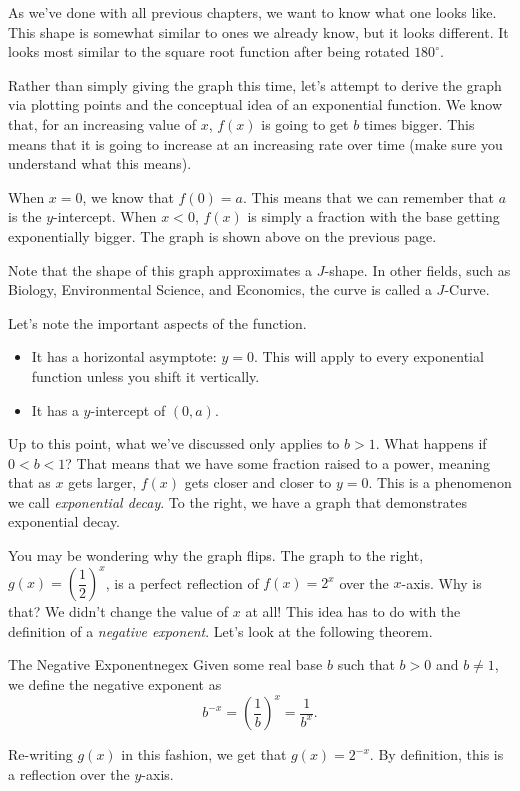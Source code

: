 \documentclass[../book.tex]{subfiles}
\begin{document}
\noindent As we've done with all previous chapters, we want to know what one looks like.  This shape is somewhat similar to ones we already know, but it looks different.  It looks most similar to the square root function after being rotated $180^{\circ}$.  

Rather than simply giving the graph this time, let's attempt to derive the graph via plotting points and the conceptual idea of an exponential function.  We know that, for an increasing value of $x$, $f(x)$ is going to get $b$ times bigger.  This means that it is going to increase at an increasing rate over time (make sure you understand what this means).

When $x=0$, we know that $f(0)=a$.  This means that we can remember that $a$ is the $y$-intercept.  When $x<0$, $f(x)$ is simply a fraction with the base getting exponentially bigger.  The graph is shown above on the previous page.

Note that the shape of this graph approximates a $J$-shape.  In other fields, such as Biology, Environmental Science, and Economics, the curve is called a $J$-Curve.

Let's note the important aspects of the function.  \begin{itemize}
    \item It has a horizontal asymptote: $y = 0$.  This will apply to every exponential function unless you shift it vertically.
    \item It has a $y$-intercept of $(0,a)$.
\end{itemize}

\noindent Up to this point, what we've discussed only applies to $b>1$.  What happens if $0<b<1$?  That means that we have some fraction raised to a power, meaning that as $x$ gets larger, $f(x)$ gets closer and closer to $y=0$.  This is a phenomenon we call \textit{exponential decay}.  To the right, we have a graph that demonstrates exponential decay.  

You may be wondering why the graph flips.  The graph to the right, $g(x)=\left(\dfrac{1}{2}\right)^x$, is a perfect reflection of $f(x)=2^x$ over the $x$-axis.  Why is that?  We didn't change the value of $x$ at all!  This idea has to do with the definition of a \textit{negative exponent}.  Let's look at the following theorem.
\begin{definition}{The Negative Exponent}{negex}
Given some real base $b$ such that $b>0$ and $b\neq 1$, we define the negative exponent as $$b^{-x}=\left(\dfrac{1}{b}\right)^x=\dfrac{1}{b^x}.$$
\end{definition}
Re-writing $g(x)$ in this fashion, we get that $g(x)=2^{-x}$.  By definition, this is a reflection over the $y$-axis.
\end{document}
